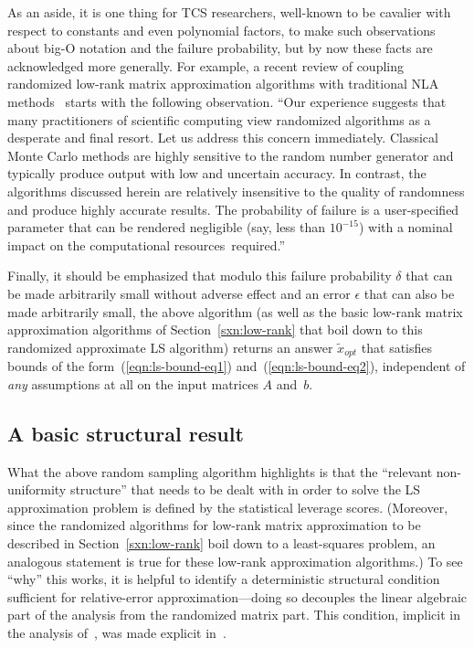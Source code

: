 \documentclass[twoside]{article}
\begin{document}
As an aside, it is one thing for TCS researchers, well-known to be cavalier 
with respect to constants and even polynomial factors, to make such 
observations about big-O notation and the failure probability, but by now 
these facts are acknowledged more generally.
For example, a recent review of coupling randomized low-rank matrix 
approximation algorithms with traditional NLA methods~\cite{HMT09_SIREV} starts 
with the following observation.
``Our experience suggests that many practitioners of scientific computing
view randomized algorithms as a desperate and final resort. Let us address
this concern immediately.  Classical Monte Carlo methods are highly 
sensitive to the random number generator and typically produce output with 
low and uncertain accuracy.  In contrast, the algorithms discussed herein 
are relatively insensitive to the quality of randomness and produce highly 
accurate results. The probability of failure is a user-specified parameter 
that can be rendered negligible (say, less than $10^{-15}$) with a nominal 
impact on the computational resources~required.''

Finally, it should be emphasized that modulo this failure probability 
$\delta$ that can be made arbitrarily small without adverse effect and an 
error $\epsilon$ that can also be made arbitrarily small, the above 
algorithm (as well as the basic low-rank matrix approximation algorithms 
of Section~\ref{sxn:low-rank} that boil down to this randomized approximate 
LS algorithm) returns an answer $\tilde{x}_{opt}$ that satisfies bounds of 
the form~(\ref{eqn:ls-bound-eq1}) and~(\ref{eqn:ls-bound-eq2}), independent 
of \emph{any} assumptions at all on the input matrices $A$ and~$b$.


\subsection{A basic structural result}
\label{sxn:least-squares:structural}

What the above random sampling algorithm highlights is that the 
``relevant non-uniformity structure'' that needs to be dealt with in order 
to solve the LS approximation problem is defined by the statistical leverage 
scores.
(Moreover, since the randomized algorithms for low-rank matrix 
approximation to be described in Section~\ref{sxn:low-rank} boil down to a 
least-squares problem, an analogous statement is true for these low-rank 
approximation algorithms.)
To see ``why'' this works, it is helpful to identify a deterministic 
structural condition sufficient for relative-error approximation---doing so
decouples the linear algebraic part of the analysis from the randomized 
matrix part.
This condition, implicit in the analysis 
of~\cite{DMM06,DMM08_CURtheory_JRNL}, was made explicit 
in~\cite{DMMS07_FastL2_NM10}.
\end{document}
